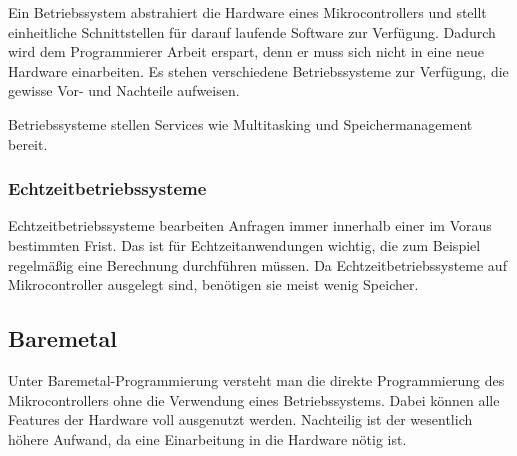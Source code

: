 \documentclass[a4paper]{article}
\begin{document}
Ein Betriebssystem abstrahiert die Hardware eines Mikrocontrollers und stellt einheitliche Schnittstellen für darauf laufende Software 
zur Verfügung. Dadurch wird dem Programmierer Arbeit erspart, denn er muss sich nicht in eine neue Hardware einarbeiten. Es stehen 
verschiedene Betriebssysteme zur Verfügung, die gewisse Vor- und Nachteile aufweisen.

Betriebssysteme stellen Services wie Multitasking und Speichermanagement bereit.

\subsubsection{Echtzeitbetriebssysteme}

Echtzeitbetriebssysteme bearbeiten Anfragen immer innerhalb einer im Voraus bestimmten Frist. Das ist für Echtzeitanwendungen wichtig, 
die zum Beispiel regelmäßig eine Berechnung durchführen müssen. Da Echtzeitbetriebssysteme auf Mikrocontroller ausgelegt sind, 
benötigen sie meist wenig Speicher.

\subsection{Baremetal}

Unter Baremetal-Programmierung versteht man die direkte Programmierung des Mikrocontrollers ohne die Verwendung eines Betriebssystems. 
Dabei können alle Features der Hardware voll ausgenutzt werden. Nachteilig ist der wesentlich höhere Aufwand, da eine Einarbeitung in 
die Hardware nötig ist.
\end{document}
